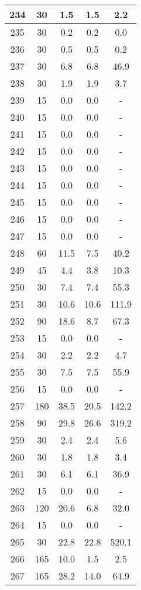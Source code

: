 \documentclass[a4paper,10pt]{article}
\begin{document}
\begin{table}
\begin{tabular}{|c|c|c|c|c|}
\hline
234 & 30 & 1.5 & 1.5 & 2.2 \\
\hline
235 & 30 & 0.2 & 0.2 & 0.0 \\
\hline
236 & 30 & 0.5 & 0.5 & 0.2 \\
\hline
237 & 30 & 6.8 & 6.8 & 46.9 \\
\hline
238 & 30 & 1.9 & 1.9 & 3.7 \\
\hline
239 & 15 & 0.0 & 0.0 & - \\
\hline
240 & 15 & 0.0 & 0.0 & - \\
\hline
241 & 15 & 0.0 & 0.0 & - \\
\hline
242 & 15 & 0.0 & 0.0 & - \\
\hline
243 & 15 & 0.0 & 0.0 & - \\
\hline
244 & 15 & 0.0 & 0.0 & - \\
\hline
245 & 15 & 0.0 & 0.0 & - \\
\hline
246 & 15 & 0.0 & 0.0 & - \\
\hline
247 & 15 & 0.0 & 0.0 & - \\
\hline
248 & 60 & 11.5 & 7.5 & 40.2 \\
\hline
249 & 45 & 4.4 & 3.8 & 10.3 \\
\hline
250 & 30 & 7.4 & 7.4 & 55.3 \\
\hline
251 & 30 & 10.6 & 10.6 & 111.9 \\
\hline
252 & 90 & 18.6 & 8.7 & 67.3 \\
\hline
253 & 15 & 0.0 & 0.0 & - \\
\hline
254 & 30 & 2.2 & 2.2 & 4.7 \\
\hline
255 & 30 & 7.5 & 7.5 & 55.9 \\
\hline
256 & 15 & 0.0 & 0.0 & - \\
\hline
257 & 180 & 38.5 & 20.5 & 142.2 \\
\hline
258 & 90 & 29.8 & 26.6 & 319.2 \\
\hline
259 & 30 & 2.4 & 2.4 & 5.6 \\
\hline
260 & 30 & 1.8 & 1.8 & 3.4 \\
\hline
261 & 30 & 6.1 & 6.1 & 36.9 \\
\hline
262 & 15 & 0.0 & 0.0 & - \\
\hline
263 & 120 & 20.6 & 6.8 & 32.0 \\
\hline
264 & 15 & 0.0 & 0.0 & - \\
\hline
265 & 30 & 22.8 & 22.8 & 520.1 \\
\hline
266 & 165 & 10.0 & 1.5 & 2.5 \\
\hline
267 & 165 & 28.2 & 14.0 & 64.9 \\

\end{tabular}
\end{table}
\end{document}
